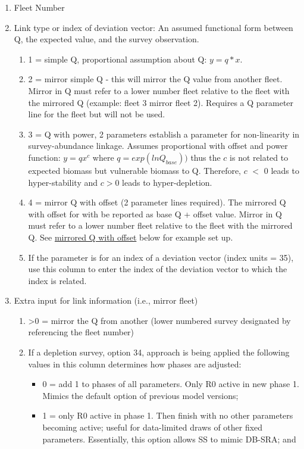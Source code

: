 \begin{enumerate}
	\item Fleet Number
	\item Link type or index of deviation vector: An assumed functional form between Q, the expected value, and the survey observation.
	\begin{enumerate}
		\item 1 = simple Q, proportional assumption about Q: $y=q*x$.
		\item 2 = mirror simple Q - this will mirror the Q value from another fleet. Mirror in Q must refer to a lower number fleet relative to the fleet with the mirrored Q (example: fleet 3 mirror fleet 2). Requires a Q parameter line for the fleet but will not be used.
		\item 3 = Q with power, 2 parameters establish a parameter for non-linearity in survey-abundance linkage.  Assumes proportional with offset and power function: $y=qx^c$ where $q = exp(lnQ_{base}))$ thus the $c$ is not related to expected biomass but vulnerable biomass to Q.  Therefore, $c$ $<$ 0 leads to hyper-stability and $c > 0$ leads to hyper-depletion.
		\item 4 = mirror Q with offset (2 parameter lines required). The mirrored Q with offset for with be reported as base Q + offset value. Mirror in Q must refer to a lower number fleet relative to the fleet with the mirrored Q. See \hyperlink{MirrorQoffset}{mirrored Q with offset} below for example set up.
		\item If the parameter is for an index of a deviation vector (index units = 35), use this column to enter the index of the deviation vector to which the index is related.
	\end{enumerate}
	\item Extra input for link information (i.e., mirror fleet)
	\begin{enumerate}
		\item >0 = mirror the Q from another (lower numbered survey designated by referencing the fleet number)
		\item If a depletion survey, option 34, approach is being applied the following values in this column determines how phases are adjusted:
		\begin{itemize}
			\item 0 = add 1 to phases of all parameters. Only R0 active in new phase 1. Mimics the default option of previous model versions;
			\item 1 = only R0 active in phase 1. Then finish with no other parameters becoming active; useful for data-limited draws of other fixed parameters.  Essentially, this option allows SS to mimic DB-SRA; and

\end{itemize}
\end{enumerate}
\end{enumerate}
